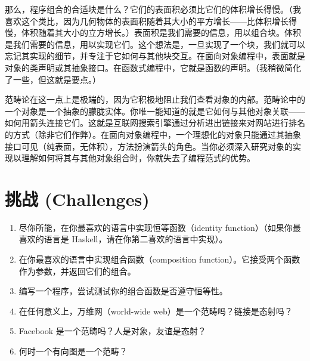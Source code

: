 那么，程序组合的合适块是什么？它们的表面积必须比它们的体积增长得慢。（我喜欢这个类比，因为几何物体的表面积随着其大小的平方增长——比体积增长得慢，体积随着其大小的立方增长。）表面积是我们需要的信息，用以组合块。体积是我们需要的信息，用以实现它们。这个想法是，一旦实现了一个块，我们就可以忘记其实现的细节，并专注于它如何与其他块交互。在面向对象编程中，表面就是对象的类声明或其抽象接口。在函数式编程中，它就是函数的声明。（我稍微简化了一些，但这就是要点。）

范畴论在这一点上是极端的，因为它积极地阻止我们查看对象的内部。范畴论中的一个对象是一个抽象的朦胧实体。你唯一能知道的就是它如何与其他对象关联——如何用箭头连接它们。这就是互联网搜索引擎通过分析进出链接来对网站进行排名的方式（除非它们作弊）。在面向对象编程中，一个理想化的对象只能通过其抽象接口可见（纯表面，无体积），方法扮演箭头的角色。当你必须深入研究对象的实现以理解如何将其与其他对象组合时，你就失去了编程范式的优势。

\section{挑战 (Challenges)}

\begin{enumerate}
  \tightlist
  \item
  尽你所能，在你最喜欢的语言中实现恒等函数（identity function）（如果你最喜欢的语言是 Haskell，请在你第二喜欢的语言中实现）。
  \item
  在你最喜欢的语言中实现组合函数（composition function）。它接受两个函数作为参数，并返回它们的组合。
  \item
  编写一个程序，尝试测试你的组合函数是否遵守恒等性。
  \item
  在任何意义上，万维网（world-wide web）是一个范畴吗？链接是态射吗？
  \item
  Facebook 是一个范畴吗？人是对象，友谊是态射？
  \item
  何时一个有向图是一个范畴？
\end{enumerate}
